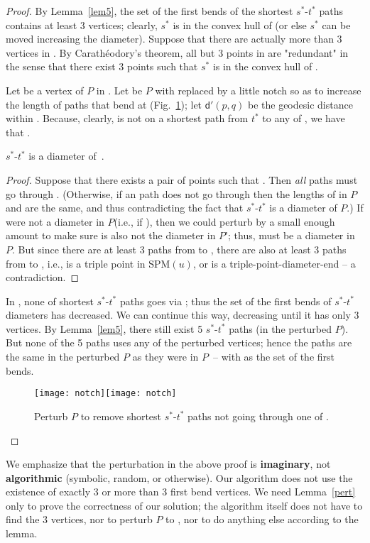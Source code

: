 \documentclass{llncs}
\newif\ifim \imtrue
\newcommand{\e}[1]{\emph{#1}}
\renewcommand\-{\textrm{-}}
\renewcommand\P{\ensuremath{P}\xspace}
\newcommand{\dpr}[2]{\ensuremath{\mathsf{d'}(#1,#2)}\xspace}
\newcommand{\spm}[1]{\ensuremath{\textrm{SPM}(#1)}\xspace}
\renewcommand\ss{\ensuremath{s^*}\xspace}
\renewcommand\tt{\ensuremath{t^*}\xspace}
\begin{document}
\begin{proof} By Lemma~\ref{lem5}, the set  of the first bends of the shortest \ss-\tt paths contains at least 3 vertices; clearly, \ss is in the convex hull of  (or else \ss can be moved increasing the diameter). Suppose that there are actually more than 3 vertices in . By Carath\'eodory's theorem, all but 3 points in  are "redundant" in the sense that there exist 3 points  such that \ss is in the convex hull of .

Let  be a vertex of \P in . Let  be \P with  replaced by a little notch so as to increase the length of paths that bend at  (Fig.~\ref{notch}); let \dpr{p}{q} be the geodesic distance within . Because, clearly,  is not on a shortest path from \tt to any of , we have that .
\begin{claim} \ss-\tt is a diameter of~.\end{claim}
\begin{proof} Suppose that there exists a pair of points  such that . Then \e{all}  paths must go through . (Otherwise, if an  path  does not go through  then the lengths of  in \P and  are the same, and thus  contradicting the fact that \ss-\tt is a diameter of \P.) If  were not a diameter in \P (i.e., if ), then we could perturb  by a small enough amount to make sure  is also not the diameter in \P'; thus,  must be a diameter in \P. But since there are at least 3 paths from  to , there are also at least 3 paths from  to , i.e.,  is a triple point in \spm{u}, or is a triple-point-diameter-end -- a contradiction.
\end{proof}
In , none of shortest \ss-\tt paths goes via ; thus the set  of the first bends of \ss-\tt diameters has decreased. We can continue this way, decreasing  until it has only 3 vertices. By Lemma~\ref{lem5}, there still exist 5 \ss-\tt paths (in the perturbed \P). But none of the 5 paths uses any of the perturbed vertices; hence the paths are the same in the perturbed \P as they were in \P\ -- with  as the set of the first bends.
\begin{figure}\centering
\ifim\texttt{[image: notch]}\quad\qquad\texttt{[image: notch]}\fi
\caption{Perturb \P to remove shortest \ss-\tt paths not going through one of .}
\label{notch}\end{figure}
\end{proof}
We emphasize that the perturbation in the above proof is {\bf imaginary}, not {\bf algorithmic} (symbolic, random, or otherwise). Our algorithm does not use the existence of exactly 3 or more than 3 first bend vertices. We need Lemma~\ref{pert} only to prove the correctness of our solution; the algorithm itself does not have to find the 3 vertices, nor to perturb \P to , nor to do anything else according to the lemma.
\end{document}
